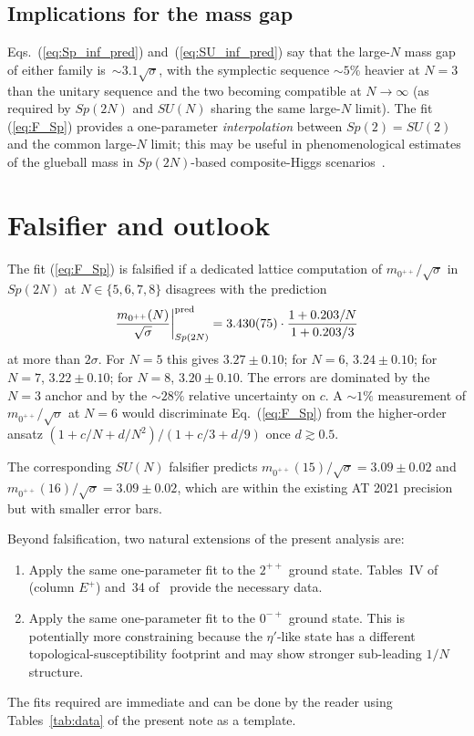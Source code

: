 \documentclass[aps,prd,reprint,nofootinbib,superscriptaddress,floatfix]{revtex4-2}
\begin{document}
\subsection{Implications for the mass gap}
Eqs.~(\ref{eq:Sp_inf_pred}) and~(\ref{eq:SU_inf_pred}) say that the
large-$N$ mass gap of either family is~$\sim\!3.1\sqrt{\sigma}$, with
the symplectic sequence ${\sim}5\%$ heavier at $N=3$ than the unitary
sequence and the two becoming compatible at $N\to\infty$ (as required by
$Sp(2N)$ and $SU(N)$ sharing the same large-$N$ limit). The fit
(\ref{eq:F_Sp}) provides a one-parameter \emph{interpolation} between
$Sp(2)=SU(2)$ and the common large-$N$ limit; this may be useful in
phenomenological estimates of the glueball mass in $Sp(2N)$-based
composite-Higgs scenarios~\cite{KaplanGeorgi1984,Cacciapaglia2014composite,%
BennettSp4_2017,HollandsKnudsenBennett2023}.

\section{Falsifier and outlook}\label{sec:conclude}
The fit (\ref{eq:F_Sp}) is falsified if a dedicated lattice computation of
$m_{0^{++}}/\sqrt{\sigma}$ in $Sp(2N)$ at $N \in \{5,6,7,8\}$ disagrees with
the prediction
\begin{equation}
   \frac{m_{0^{++}}(N)}{\sqrt{\sigma}}\bigg|_{Sp(2N)}^{\rm pred}
   = 3.430(75)\cdot \frac{1 + 0.203/N}{1 + 0.203/3}
   \label{eq:Sp_falsifier}
\end{equation}
at more than $2\sigma$. For $N=5$ this gives
$3.27 \pm 0.10$; for $N=6$, $3.24 \pm 0.10$; for $N=7$, $3.22 \pm 0.10$;
for $N=8$, $3.20 \pm 0.10$. The errors are dominated by the
$N=3$ anchor and by the $\sim\!28\%$ relative uncertainty on $c$. A
$\sim\!1\%$ measurement of $m_{0^{++}}/\sqrt{\sigma}$ at $N=6$ would
discriminate Eq.~(\ref{eq:F_Sp}) from the higher-order ansatz
$(1+c/N+d/N^2)/(1+c/3+d/9)$ once $d \gtrsim 0.5$.

The corresponding $SU(N)$ falsifier predicts
$m_{0^{++}}(15)/\sqrt{\sigma} = 3.09 \pm 0.02$ and
$m_{0^{++}}(16)/\sqrt{\sigma} = 3.09 \pm 0.02$, which are within the
existing AT 2021 precision but with smaller error bars.

Beyond falsification, two natural extensions of the present analysis are:
\begin{enumerate}
\item Apply the same one-parameter fit to the $2^{++}$ ground state.
   Tables~IV of~\cite{BennettHolligan2021} (column $E^{+}$) and~34 of~%
   \cite{AthenodorouTeper2021} provide the necessary data.
\item Apply the same one-parameter fit to the $0^{-+}$ ground state. This
   is potentially more constraining because the $\eta'$-like state has a
   different topological-susceptibility footprint and may show stronger
   sub-leading $1/N$ structure.
\end{enumerate}
The fits required are immediate and can be done by the reader using
Tables~\ref{tab:data} of the present note as a template.
\end{document}
